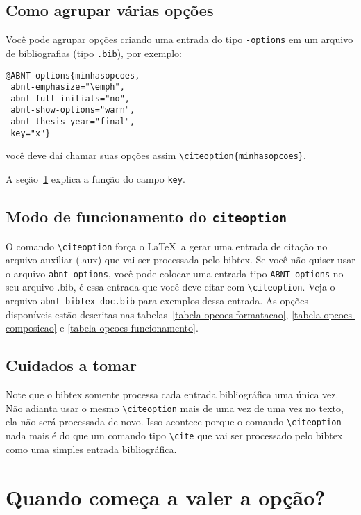 \documentclass[espacosimples]{abnt}
\begin{document}
\subsection{Como agrupar várias opções}

Você pode agrupar opções criando uma entrada do tipo {\tt \@ABNT-options}
em um arquivo de bibliografias (tipo {\tt .bib}), por exemplo:
\begin{verbatim}
@ABNT-options{minhasopcoes,
 abnt-emphasize="\emph",
 abnt-full-initials="no",
 abnt-show-options="warn",
 abnt-thesis-year="final",
 key="x"}
\end{verbatim}

você deve daí chamar suas opções assim \verb+\citeoption{minhasopcoes}+.

A seção~\ref{section-quando-vale} explica a função do campo {\tt key}.

\subsection{Modo de funcionamento do {\tt citeoption}}

O comando \verb+\citeoption+ força o \LaTeX\ a gerar
uma entrada de citação no arquivo auxiliar (.aux) que vai ser processada
pelo bibtex. Se você não quiser usar o arquivo {\tt abnt-options}, você
pode colocar uma entrada tipo {\tt ABNT-options}
no seu arquivo .bib, é essa entrada que você deve citar com \verb+\citeoption+.
Veja o arquivo
{\tt abnt-bibtex-doc.bib} para exemplos dessa entrada.
As opções disponíveis estão descritas nas
tabelas~\ref{tabela-opcoes-formatacao}, \ref{tabela-opcoes-composicao} e
\ref{tabela-opcoes-funcionamento}.

\subsection{Cuidados a tomar}

Note que o bibtex
somente processa cada entrada bibliográfica uma única vez. Não adianta usar
o mesmo \verb+\citeoption+ mais de uma vez de uma vez no texto, ela não
será processada de novo. Isso acontece porque o comando \verb+\citeoption+
nada mais é do que um comando tipo \verb+\cite+ que vai ser processado
pelo bibtex como uma simples entrada bibliográfica.

\section{Quando começa a valer a opção?}
\label{section-quando-vale}
\end{document}
